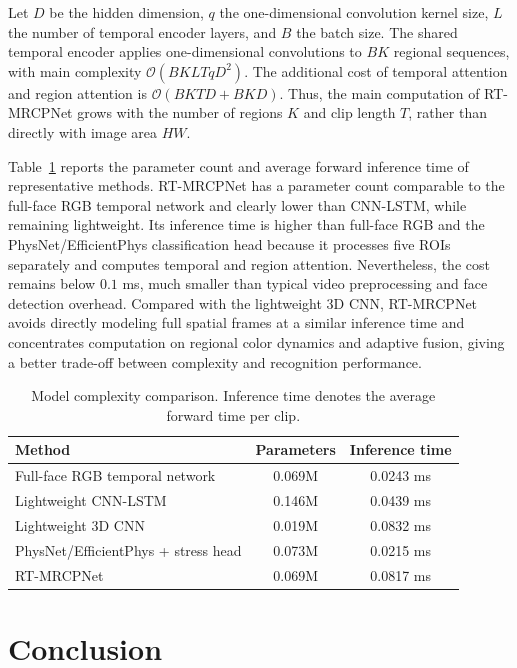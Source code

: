 \documentclass[runningheads]{llncs}
\begin{document}
Let $D$ be the hidden dimension, $q$ the one-dimensional convolution kernel size, $L$ the number of temporal encoder layers, and $B$ the batch size. The shared temporal encoder applies one-dimensional convolutions to $B K$ regional sequences, with main complexity $\mathcal{O}(B K L T q D^2)$. The additional cost of temporal attention and region attention is $\mathcal{O}(B K T D + B K D)$. Thus, the main computation of RT-MRCPNet grows with the number of regions $K$ and clip length $T$, rather than directly with image area $H W$.

Table~\ref{tab:complexity} reports the parameter count and average forward inference time of representative methods. RT-MRCPNet has a parameter count comparable to the full-face RGB temporal network and clearly lower than CNN-LSTM, while remaining lightweight. Its inference time is higher than full-face RGB and the PhysNet/EfficientPhys classification head because it processes five ROIs separately and computes temporal and region attention. Nevertheless, the cost remains below $0.1$ ms, much smaller than typical video preprocessing and face detection overhead. Compared with the lightweight 3D CNN, RT-MRCPNet avoids directly modeling full spatial frames at a similar inference time and concentrates computation on regional color dynamics and adaptive fusion, giving a better trade-off between complexity and recognition performance.

\begin{table}
\caption{Model complexity comparison. Inference time denotes the average forward time per clip.}
\label{tab:complexity}
\centering
\begin{tabular}{lcc}
\toprule
Method & Parameters & Inference time \\
\midrule
Full-face RGB temporal network & 0.069M & 0.0243 ms \\
Lightweight CNN-LSTM & 0.146M & 0.0439 ms \\
Lightweight 3D CNN & 0.019M & 0.0832 ms \\
PhysNet/EfficientPhys + stress head & 0.073M & 0.0215 ms \\
RT-MRCPNet & 0.069M & 0.0817 ms \\
\bottomrule
\end{tabular}
\end{table}

\section{Conclusion}
\end{document}

